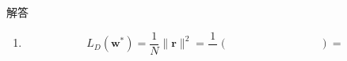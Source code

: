 \documentclass[a4paper,dvipdfmx]{jsarticle}
\newcommand{\提出期限}{2026年10月19日（月）}
\newcommand{\学籍番号}{0000000}
\newcommand{\氏名}{氏名を書く}
\newcommand{\提出日}{2026年10月19日}
\newenvironment{answer}{\begin{itembox}[l]{解答}}{\end{itembox}}
\begin{document}
\begin{enumerate}
\begin{answer}
\begin{enumerate}
\begin{equation*}
            \bm{r} = \bm{y} - \hat{\bm{y}} = \phantom{XXXXXXXXXX}
          \end{equation*}
          \begin{align*}
            \bm{c}_0^\top\bm{r} &= \\
            \bm{c}_1^\top\bm{r} &=
          \end{align*}
          よって $\bm{X}^\top\bm{r} = $ \phantom{XXXX}。
          $\bm{c}_0^\top\bm{r} = 0$ の意味（残差について）：
        \item
          \begin{equation*}
            L_D(\bm{w}^*) = \frac{1}{N}\|\bm{r}\|^2 = \frac{1}{\phantom{X}}\left( \phantom{XXXXXXXXXX} \right) =
          \end{equation*}
      \end{enumerate}
    \end{answer}


\end{enumerate}
\end{document}

